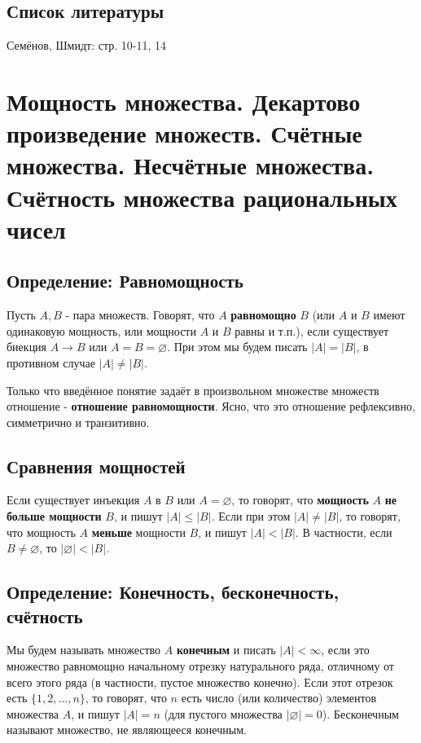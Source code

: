 \documentclass{article}
\begin{document}
\subsection*{Список литературы}
Семёнов, Шмидт: стр. 10-11, 14

\newpage
\section{Мощность множества. Декартово произведение множеств. Счётные множества. Несчётные множества. Счётность множества рациональных чисел}

\subsection{Определение: Равномощность}

Пусть $A, B$ - пара множеств. Говорят, что $A$ \textbf{равномощно} $B$ (или $A$ и $B$ имеют одинаковую мощность, или мощности $A$ и $B$ равны и т.п.), если существует биекция $A \rightarrow B$ или $A = B = \varnothing$. При этом мы будем писать $|A| = |B|$, в противном случае $|A|\neq|B|$.

Только что введённое понятие задаёт в произвольном множестве множеств отношение - \textbf{отношение равномощности}. Ясно, что это отношение рефлексивно, симметрично и транзитивно.

\subsection{Сравнения мощностей}

Если существует инъекция $A$ в $B$ или $A = \varnothing$, то говорят, что \textbf{мощность} $A$ \textbf{не больше мощности} $B$, и пишут $|A| \leq |B|$. Если при этом $|A| \neq |B|$, то говорят, что мощность $A$ \textbf{меньше} мощности $B$, и пишут $|A| < |B|$. В частности, если $B \neq \varnothing$, то $|\varnothing| < |B|$.

\subsection{Определение: Конечность, бесконечность, счётность}

Мы будем называть множество $A$ \textbf{конечным} и писать $|A| < \infty$, если это множество равномощно начальному отрезку натурального ряда, отличному от всего этого ряда (в частности, пустое множество конечно). Если этот отрезок есть $\{1, 2, \dots, n\}$, то говорят, что $n$ есть число (или количество) элементов множества $A$, и пишут $|A| = n$ (для пустого множества $|\varnothing| = 0$). Бесконечным называют множество, не являющееся конечным.
\end{document}
